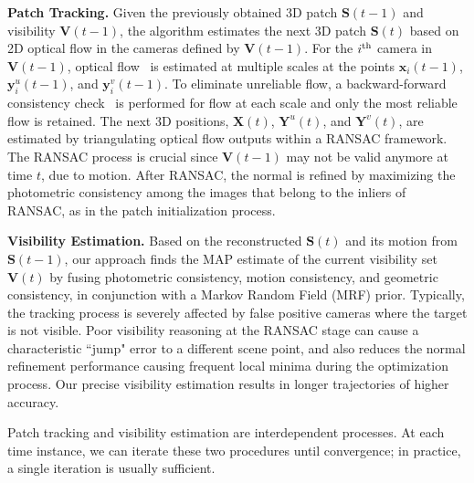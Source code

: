 \documentclass[10pt,twocolumn,letterpaper]{article}
\begin{document}
\noindent \textbf{Patch Tracking.} Given the previously obtained 3D patch $\mathbf{S}(t-1)$ and visibility $\mathbf{V}(t-1)$, the algorithm estimates the next 3D patch $\mathbf{S}(t)$ based on 2D optical flow in the cameras defined by $\mathbf{V}(t-1)$. For the $i^{\rm th}$ camera in $\mathbf{V}(t-1)$, optical flow~\cite{Lucas1981} is estimated at multiple scales at the points $\mathbf{x}_i(t-1)$, $\mathbf{y}^u_i(t-1)$, and $\mathbf{y}^v_i(t-1)$. To eliminate unreliable flow, a backward-forward consistency check~\cite{sundaram2010dense} is performed for flow at each scale and only the most reliable flow is retained. The next 3D positions, $\mathbf{X}(t)$, $\mathbf{Y}^{u}(t)$, and $\mathbf{Y}^{v}(t)$, are estimated by triangulating optical flow outputs within a RANSAC framework. The RANSAC process is crucial since $\mathbf{V}(t-1)$ may not be valid anymore at time $t$, due to motion. After RANSAC, the normal is refined by maximizing the photometric consistency among the images that belong to the inliers of RANSAC, as in the patch initialization process.


\noindent \textbf{Visibility Estimation.} Based on the reconstructed $\mathbf{S}(t)$ and its motion from $\mathbf{S}(t-1)$, our approach finds the MAP estimate of the current visibility set $\mathbf{V}(t)$ by fusing photometric consistency, motion consistency, and geometric consistency, in conjunction with a Markov Random Field (MRF) prior. Typically, the tracking process is severely affected by false positive cameras where the target is not visible. Poor visibility reasoning at the RANSAC stage can cause a characteristic ``jump" error to a different scene point, and also reduces the normal refinement performance causing frequent local minima during the optimization process. Our precise visibility estimation results in longer trajectories of higher accuracy.

Patch tracking and visibility estimation are interdependent processes. At each time instance, we can iterate these two procedures until convergence; in practice, a single iteration is usually sufficient.  
\end{document}
